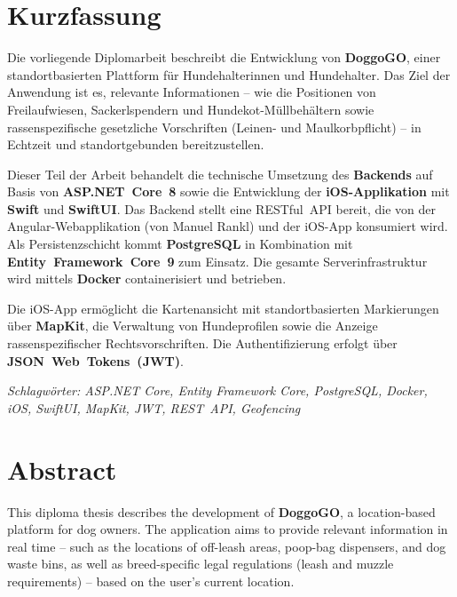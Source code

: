 \chapter*{Kurzfassung}

Die vorliegende Diplomarbeit beschreibt die Entwicklung von \textbf{DoggoGO}, einer standortbasierten
Plattform für Hundehalter\-innen und Hundehalter. Das Ziel der Anwendung ist es, relevante
Informationen – wie die Positionen von Freilaufwiesen, Sackerlspendern und Hundekot-Müllbehältern
sowie rassenspezifische gesetzliche Vorschriften (Leinen- und Maulkorbpflicht) – in Echtzeit und
standortgebunden bereitzustellen.

Dieser Teil der Arbeit behandelt die technische Umsetzung des \textbf{Backends} auf Basis von
\textbf{ASP.NET~Core~8} sowie die Entwicklung der \textbf{iOS-Applikation} mit \textbf{Swift} und
\textbf{SwiftUI}. Das Backend stellt eine RESTful~API bereit, die von der Angular-Webapplikation
(von Manuel Rankl) und der iOS-App konsumiert wird. Als Persistenzschicht kommt \textbf{PostgreSQL}
in Kombination mit \textbf{Entity~Framework~Core~9} zum Einsatz. Die gesamte Serverinfrastruktur
wird mittels \textbf{Docker} containerisiert und betrieben.

Die iOS-App ermöglicht die Kartenansicht mit standortbasierten Markierungen über \textbf{MapKit},
die Verwaltung von Hundeprofilen sowie die Anzeige rassenspezifischer Rechtsvorschriften. Die
Authentifizierung erfolgt über \textbf{JSON~Web~Tokens~(JWT)}.

\vspace{1.5em}
\noindent\textit{Schlagwörter: ASP.NET Core, Entity Framework Core, PostgreSQL, Docker, iOS, SwiftUI,
MapKit, JWT, REST~API, Geofencing}

\clearpage

\chapter*{Abstract}

This diploma thesis describes the development of \textbf{DoggoGO}, a location-based platform for
dog owners. The application aims to provide relevant information in real time – such as the
locations of off-leash areas, poop-bag dispensers, and dog waste bins, as well as
breed-specific legal regulations (leash and muzzle requirements) – based on the user's current
location.

